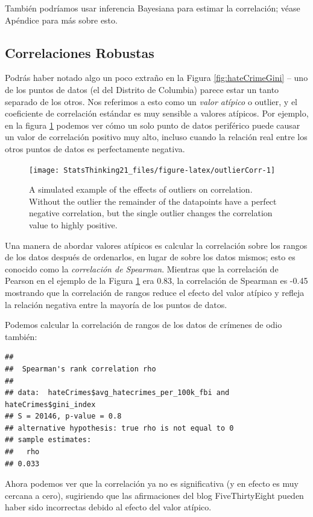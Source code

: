 \documentclass[
  12pt,
]{book}
\begin{document}
También podríamos usar inferencia Bayesiana para estimar la correlación; véase Apéndice para más sobre esto.

\hypertarget{robust-correlations}{%
\subsection{Correlaciones Robustas}\label{robust-correlations}}

Podrás haber notado algo un poco extraño en la Figura \ref{fig:hateCrimeGini} -- uno de los puntos de datos (el del Distrito de Columbia) parece estar un tanto separado de los otros. Nos referimos a esto como un \emph{valor atípico} o outlier, y el coeficiente de correlación estándar es muy sensible a valores atípicos. Por ejemplo, en la figura \ref{fig:outlierCorr} podemos ver cómo un solo punto de datos periférico puede causar un valor de correlación positivo muy alto, incluso cuando la relación real entre los otros puntos de datos es perfectamente negativa.

\begin{figure}
\texttt{[image: StatsThinking21\_files/figure-latex/outlierCorr-1]} \caption{A simulated example of the effects of outliers on correlation.  Without the outlier the remainder of the datapoints have a perfect negative correlation, but the single outlier changes the correlation value to highly positive.}\label{fig:outlierCorr}
\end{figure}

Una manera de abordar valores atípicos es calcular la correlación sobre los rangos de los datos después de ordenarlos, en lugar de sobre los datos mismos; esto es conocido como la \emph{correlación de Spearman}. Mientras que la correlación de Pearson en el ejemplo de la Figura \ref{fig:outlierCorr} era 0.83, la correlación de Spearman es -0.45 mostrando que la correlación de rangos reduce el efecto del valor atípico y refleja la relación negativa entre la mayoría de los puntos de datos.

Podemos calcular la correlación de rangos de los datos de crímenes de odio también:

\begin{verbatim}
## 
## 	Spearman's rank correlation rho
## 
## data:  hateCrimes$avg_hatecrimes_per_100k_fbi and hateCrimes$gini_index
## S = 20146, p-value = 0.8
## alternative hypothesis: true rho is not equal to 0
## sample estimates:
##   rho 
## 0.033
\end{verbatim}

Ahora podemos ver que la correlación ya no es significativa (y en efecto es muy cercana a cero), sugiriendo que las afirmaciones del blog FiveThirtyEight pueden haber sido incorrectas debido al efecto del valor atípico.
\end{document}

